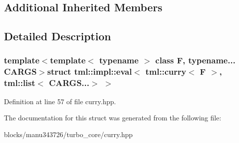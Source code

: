 \subsection*{Additional Inherited Members}


\subsection{Detailed Description}
\subsubsection*{template$<$template$<$ typename $>$ class F, typename... C\+A\+R\+G\+S$>$struct tml\+::impl\+::eval$<$ tml\+::curry$<$ F $>$, tml\+::list$<$ C\+A\+R\+G\+S...$>$ $>$}



Definition at line 57 of file curry.\+hpp.



The documentation for this struct was generated from the following file\+:\begin{DoxyCompactItemize}
\item 
blocks/manu343726/turbo\+\_\+core/curry.\+hpp\end{DoxyCompactItemize}
